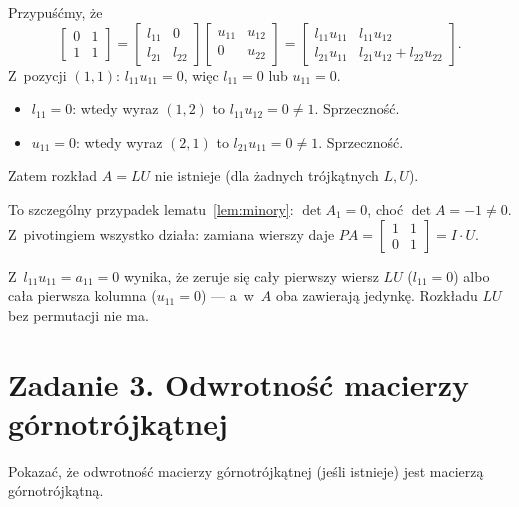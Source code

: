\documentclass[11pt]{article}
\begin{document}
\formalnie
Przypuśćmy, że
\[
\begin{bmatrix}0&1\\1&1\end{bmatrix}
=\begin{bmatrix}l_{11}&0\\l_{21}&l_{22}\end{bmatrix}
\begin{bmatrix}u_{11}&u_{12}\\0&u_{22}\end{bmatrix}
=\begin{bmatrix}l_{11}u_{11}&l_{11}u_{12}\\l_{21}u_{11}&l_{21}u_{12}+l_{22}u_{22}\end{bmatrix}.
\]
Z~pozycji $(1,1)$: $l_{11}u_{11}=0$, więc $l_{11}=0$ lub $u_{11}=0$.
\begin{itemize}
\item $l_{11}=0$: wtedy wyraz $(1,2)$ to $l_{11}u_{12}=0\ne1$. Sprzeczność.
\item $u_{11}=0$: wtedy wyraz $(2,1)$ to $l_{21}u_{11}=0\ne1$. Sprzeczność.
\end{itemize}
Zatem rozkład $A=LU$ nie istnieje (dla żadnych trójkątnych $L,U$).

\begin{uwaga}
To szczególny przypadek lematu~\ref{lem:minory}: $\det A_1=0$, choć
$\det A=-1\ne0$. Z~pivotingiem wszystko działa: zamiana wierszy daje
$PA=\left[\begin{smallmatrix}1&1\\0&1\end{smallmatrix}\right]=I\cdot U$.
\end{uwaga}

\begin{odpowiedz}
Z~$l_{11}u_{11}=a_{11}=0$ wynika, że zeruje się cały pierwszy wiersz $LU$
($l_{11}=0$) albo cała pierwsza kolumna ($u_{11}=0$) --- a~w~$A$ oba zawierają
jedynkę. Rozkładu $LU$ bez permutacji nie ma.
\end{odpowiedz}

\section{Zadanie 3. Odwrotność macierzy górnotrójkątnej}
\begin{tresc}
Pokazać, że odwrotność macierzy górnotrójkątnej (jeśli istnieje) jest
macierzą górnotrójkątną.
\end{tresc}
\end{document}
